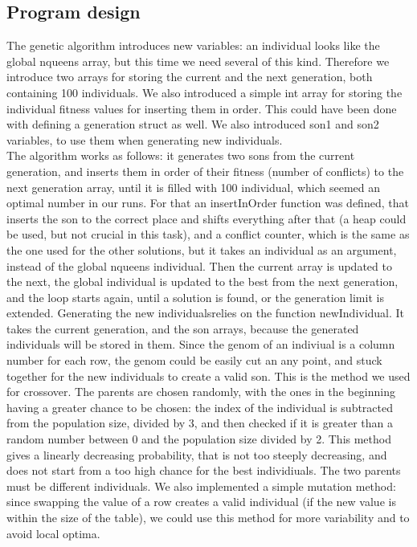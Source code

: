 \documentclass{article}
\begin{document}
\subsection*{Program design}
The genetic algorithm introduces new variables: an individual looks like the global nqueens array, but this time we need several of this kind. Therefore we introduce two arrays for storing the current and the next generation, both containing 100 individuals. We also introduced a simple int array for storing the individual fitness values for inserting them in order. This could have been done with defining a generation struct as well. We also introduced son1 and son2 variables, to use them when generating new individuals.\\
The algorithm works as follows: it generates two sons from the current generation, and inserts them in order of their fitness (number of conflicts) to the next generation array, until it is filled with 100 individual, which seemed an optimal number in our runs. For that an insertInOrder function was defined, that inserts the son to the correct place and shifts everything after that (a heap could be used, but not crucial in this task), and a conflict counter, which is the same as the one used for the other solutions, but it takes an individual as an argument, instead of the global nqueens individual. Then the current array is updated to the next, the global individual is updated to the best from the next generation, and the loop starts again, until a solution is found, or the generation limit is extended.
Generating the new individualsrelies on the function newIndividual. It takes the current generation, and the son arrays, because the generated individuals will be stored in them. Since the genom of an indiviual is a column number for each row, the genom could be easily cut an any point, and stuck together for the new individuals to create a valid son. This is the method we used for crossover. The parents are chosen randomly, with the ones in the beginning having a greater chance to be chosen: the index of the individual is subtracted from the population size, divided by 3, and then checked if it is greater than a random number between 0 and the population size divided by 2. This method gives a linearly decreasing probability, that is not too steeply decreasing, and does not start from a too high chance for the best individiuals. The two parents must be different individuals.
We also implemented a simple mutation method: since swapping the value of a row creates a valid individual (if the new value is within the size of the table), we could use this method for more variability and to avoid local optima.
\end{document}
